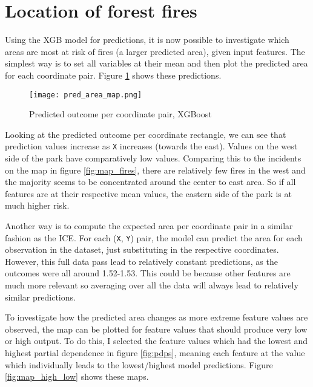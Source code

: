 \documentclass{article}
\begin{document}
\section{Location of forest fires}


Using the XGB model for predictions, it is now possible to investigate which areas are most at risk of fires (a larger predicted area), given input features. The simplest way is to set all variables at their mean and then plot the predicted area for each coordinate pair. Figure \ref{fig:pred_area_map} shows these predictions.

\begin{figure}[!htbp]
    \centering
    \texttt{[image: pred\_area\_map.png]}
    \caption{Predicted outcome per coordinate pair, XGBoost}
    \label{fig:pred_area_map}
\end{figure}

Looking at the predicted outcome per coordinate rectangle, we can see that prediction values increase as \texttt{X} increases (towards the east). Values on the west side of the park have comparatively low values. Comparing this to the incidents on the map in figure \ref{fig:map_fires}, there are relatively few fires in the west and the majority seems to be concentrated around the center to east area. So if all features are at their respective mean values, the eastern side of the park is at much higher risk.

Another way is to compute the expected area per coordinate pair in a similar fashion as the ICE. For each (\texttt{X}, \texttt{Y}) pair, the model can predict the area for each observation in the dataset, just substituting in the respective coordinates. However, this full data pass lead to relatively constant predictions, as the outcomes were all around 1.52-1.53. This could be because other features are much more relevant so averaging over all the data will always lead to relatively similar predictions. 

To investigate how the predicted area changes as more extreme feature values are observed, the map can be plotted for feature values that should produce very low or high output. To do this, I selected the feature values which had the lowest and highest partial dependence in figure \ref{fig:pdps}, meaning each feature at the value which individually leads to the lowest/highest model predictions. Figure \ref{fig:map_high_low} shows these maps.
\end{document}
